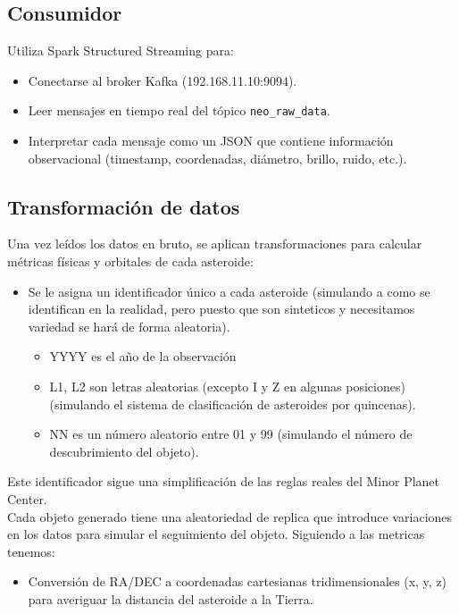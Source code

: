 \documentclass[12pt]{article}
\begin{document}
\subsection{Consumidor}
Utiliza Spark Structured Streaming para:

\begin{itemize}
  \item Conectarse al broker Kafka (192.168.11.10:9094).
  \item Leer mensajes en tiempo real del tópico \texttt{neo\_raw\_data}.
  \item Interpretar cada mensaje como un JSON que contiene información observacional 
        (timestamp, coordenadas, diámetro, brillo, ruido, etc.).
\end{itemize}

\subsection{Transformación de datos}
Una vez leídos los datos en bruto, se aplican transformaciones para calcular métricas físicas y orbitales de cada asteroide:
\\
\begin{itemize}
  \item Se le asigna un identificador único a cada asteroide (simulando a como se identifican en la realidad, pero puesto que son sinteticos
  y necesitamos variedad se hará de forma aleatoria).
  \begin{itemize}
    \item YYYY es el año de la observación
    \item L1, L2 son letras aleatorias (excepto I y Z en algunas posiciones)(simulando el sistema de clasificación de asteroides por quincenas).
    \item NN es un número aleatorio entre 01 y 99 (simulando el número de descubrimiento del objeto).
  \end{itemize}
\end{itemize}
Este identificador sigue una simplificación de las reglas reales del Minor Planet Center.
\\
Cada objeto generado tiene una aleatoriedad de replica que introduce variaciones en los datos para simular el seguimiento del objeto.
Siguiendo a las metricas tenemos:
\\
\begin{itemize}
  \item Conversión de RA/DEC a coordenadas cartesianas tridimensionales (x, y, z) para averiguar la distancia del asteroide a la Tierra.
\end{itemize}
\end{document}
